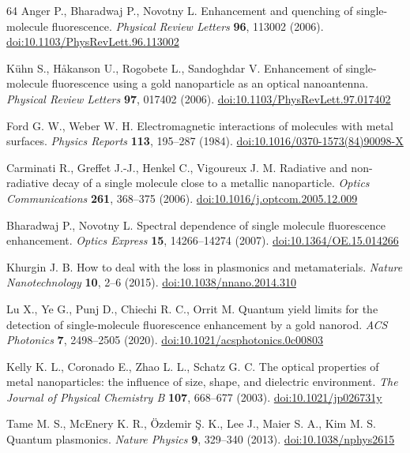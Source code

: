 \begin{thebibliography}{64}
 Anger P., Bharadwaj P., Novotny L. Enhancement and quenching of single-molecule fluorescence. \textit{Physical Review Letters} \textbf{96}, 113002 (2006). \href{https://doi.org/10.1103/PhysRevLett.96.113002}{doi:10.1103/PhysRevLett.96.113002}

 Kühn S., Håkanson U., Rogobete L., Sandoghdar V. Enhancement of single-molecule fluorescence using a gold nanoparticle as an optical nanoantenna. \textit{Physical Review Letters} \textbf{97}, 017402 (2006). \href{https://doi.org/10.1103/PhysRevLett.97.017402}{doi:10.1103/PhysRevLett.97.017402}

 Ford G. W., Weber W. H. Electromagnetic interactions of molecules with metal surfaces. \textit{Physics Reports} \textbf{113}, 195--287 (1984). \href{https://doi.org/10.1016/0370-1573(84)90098-X}{doi:10.1016/0370-1573(84)90098-X}

 Carminati R., Greffet J.-J., Henkel C., Vigoureux J. M. Radiative and non-radiative decay of a single molecule close to a metallic nanoparticle. \textit{Optics Communications} \textbf{261}, 368--375 (2006). \href{https://doi.org/10.1016/j.optcom.2005.12.009}{doi:10.1016/j.optcom.2005.12.009}

 Bharadwaj P., Novotny L. Spectral dependence of single molecule fluorescence enhancement. \textit{Optics Express} \textbf{15}, 14266--14274 (2007). \href{https://doi.org/10.1364/OE.15.014266}{doi:10.1364/OE.15.014266}

 Khurgin J. B. How to deal with the loss in plasmonics and metamaterials. \textit{Nature Nanotechnology} \textbf{10}, 2--6 (2015). \href{https://doi.org/10.1038/nnano.2014.310}{doi:10.1038/nnano.2014.310}

 Lu X., Ye G., Punj D., Chiechi R. C., Orrit M. Quantum yield limits for the detection of single-molecule fluorescence enhancement by a gold nanorod. \textit{ACS Photonics} \textbf{7}, 2498--2505 (2020). \href{https://doi.org/10.1021/acsphotonics.0c00803}{doi:10.1021/acsphotonics.0c00803}

 Kelly K. L., Coronado E., Zhao L. L., Schatz G. C. The optical properties of metal nanoparticles: the influence of size, shape, and dielectric environment. \textit{The Journal of Physical Chemistry B} \textbf{107}, 668--677 (2003). \href{https://doi.org/10.1021/jp026731y}{doi:10.1021/jp026731y}

 Tame M. S., McEnery K. R., Özdemir Ş. K., Lee J., Maier S. A., Kim M. S. Quantum plasmonics. \textit{Nature Physics} \textbf{9}, 329--340 (2013). \href{https://doi.org/10.1038/nphys2615}{doi:10.1038/nphys2615}


\end{thebibliography}
